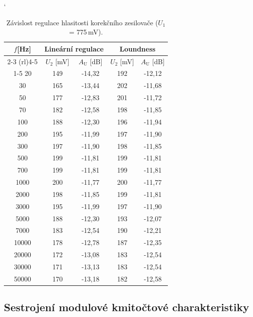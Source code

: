\documentclass[a4paper, czech]{article}
\begin{document}
\begin{table}[H]
    \catcode`
    \centering
    \caption{Závislost regulace hlasitosti korekčního zesilovače ($U_1$ = 775\,mV).}
    \begin{tabular}{ccccc}
        \toprule
        \multirow{2}{*}{\setstretch{2}$f$[Hz]} & \multicolumn{2}{c}{Lineární regulace} & \multicolumn{2}{c}{Loundness} \\
        \cmidrule(rl){2-3}
        \cmidrule(rl){4-5}
        & $U_2$ [mV] & $A_\text{U}$ [dB] & $U_2$ [mV] & $A_\text{U}$ [dB] \\
        \cmidrule(rl){1-5}
        20    & 149 & -14,32 & 192 & -12,12 \\
        30    & 165 & -13,44 & 202 & -11,68 \\
        50    & 177 & -12,83 & 201 & -11,72 \\
        70    & 182 & -12,58 & 198 & -11,85 \\
        100   & 188 & -12,30 & 196 & -11,94 \\
        200   & 195 & -11,99 & 197 & -11,90 \\
        300   & 197 & -11,90 & 198 & -11,85 \\
        500   & 199 & -11,81 & 199 & -11,81 \\
        700   & 199 & -11,81 & 199 & -11,81 \\
        1000  & 200 & -11,77 & 200 & -11,77 \\
        2000  & 198 & -11,85 & 199 & -11,81 \\
        3000  & 195 & -11,99 & 197 & -11,90 \\
        5000  & 188 & -12,30 & 193 & -12,07 \\
        7000  & 183 & -12,54 & 190 & -12,21 \\
        10000 & 178 & -12,78 & 187 & -12,35 \\
        20000 & 172 & -13,08 & 183 & -12,54 \\
        30000 & 171 & -13,13 & 183 & -12,54 \\
        50000 & 170 & -13,18 & 182 & -12,58 \\
        \bottomrule
    \end{tabular}
\end{table}

\subsection{Sestrojení modulové kmitočtové charakteristiky}
\end{document}
